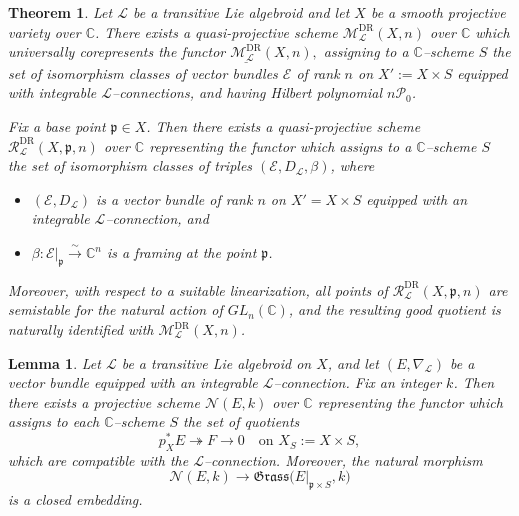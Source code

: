 \documentclass[10pt,a4paper]{amsart}
\newtheorem{thm}{Theorem}
\newtheorem{lem}{Lemma}
\begin{document}
\begin{thm}\label{eqn: moduli-of-L-connection on VB}
Let $\mathcal{L}$ be a transitive Lie algebroid and let $X$ be a smooth projective variety over $\mathbb{C}$. There exists a
quasi-projective scheme $\mathcal{M}^{\text{DR}}_{\mathcal{L}}(X,n)$ over $\mathbb{C}$ which universally corepresents the functor 
$\underline{\mathcal{M}^{\text{DR}}_{\mathcal{L}}}(X,n),$
assigning to a $\mathbb{C}$--scheme $S$ the set of isomorphism classes of
vector bundles $\mathcal{E}$ of rank $n$ on $X' := X \times S$
equipped with integrable $\mathcal{L}$--connections, and having Hilbert
polynomial $n\mathcal{P}_{0}$.
	
Fix a base point $\mathfrak{p} \in X$.  
Then there exists a quasi-projective scheme $\mathcal{R}^{\text{DR}}_{\mathcal{L}}(X,\mathfrak{p},n)$ over $\mathbb{C}$ representing the functor which assigns to a $\mathbb{C}$--scheme $S$ the set of isomorphism classes of triples $(\mathcal{E},D_{\mathcal{L}},\beta)$, where
\begin{itemize}
		\item $(\mathcal{E},D_{\mathcal{L}})$ is a vector bundle of rank $n$ on $X' = X \times S$ equipped with an integrable $\mathcal{L}$--connection, and
		\item $\beta : \mathcal{E}|_{\mathfrak{p}} \xrightarrow{\sim} \mathbb{C}^{n}$ is a framing at the point $\mathfrak{p}$.
\end{itemize}
	Moreover, with respect to a suitable linearization, all points of $\mathcal{R}^{\text{DR}}_{\mathcal{L}}(X,\mathfrak{p},n)$ are semistable for the natural action of $GL_{n}(\mathbb{C})$, and the resulting good quotient is naturally identified with $\mathcal{M}^{\text{DR}}_{\mathcal{L}}(X,n)$.
\end{thm}

\begin{lem}\label{lem:projective-scheme-N(E,k)}
	Let $\mathcal{L}$ be a transitive Lie algebroid on $X$, and let $(E,\nabla_{\mathcal L})$
	be a vector bundle equipped with an integrable $\mathcal L$--connection.
	Fix an integer $k$.
	Then there exists a projective scheme $\mathcal{N}(E,k)$ over $\mathbb{C}$
	representing the functor which assigns to each $\mathbb{C}$--scheme $S$
	the set of quotients
	\[
	p_X^*E \twoheadrightarrow F \to 0
	\quad \text{on } X_S := X\times S,
	\]
	which are compatible with the $\mathcal L$--connection.
	Moreover, the natural morphism
	\[
	\mathcal{N}(E,k) \longrightarrow
	\mathfrak{Grass}\bigl(E|_{\mathfrak p\times S},k\bigr)
	\]
	is a closed embedding.
\end{lem}
\end{document}
